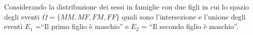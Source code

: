 \begin{esercizio}
 \label{ese:9.5}
 Considerando la distribuzione dei sessi in famiglie con due figli in cui lo 
spazio degli eventi \(\Omega =\{{MM}, {MF}, {FM}, {FF}\}\) quali sono 
l'intersezione e l'unione degli eventi \(E_1\) =``Il primo figlio è maschio'' e 
\(E_2\) = ``Il secondo figlio è maschio''.
\end{esercizio}

\subsubsection*{}

% 
% 
% 
% 
% 

